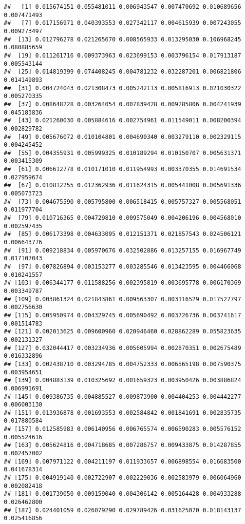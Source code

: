 \documentclass[
]{article}
\begin{document}
\begin{verbatim}
##   [1] 0.015674151 0.055481011 0.006943547 0.007470692 0.010689656 0.007471493
##   [7] 0.017156971 0.040393553 0.027342117 0.004615939 0.007243055 0.009273497
##  [13] 0.012796278 0.021265670 0.008565933 0.013295030 0.106968245 0.080885659
##  [19] 0.011261716 0.009373963 0.023699153 0.003796154 0.017913187 0.005543144
##  [25] 0.014819399 0.074408245 0.004781232 0.032287201 0.006821806 0.014149893
##  [31] 0.004724043 0.021308473 0.005242113 0.005816913 0.021030322 0.005270335
##  [37] 0.008648228 0.003264054 0.007839428 0.009285806 0.004241939 0.045183836
##  [43] 0.021260030 0.005884616 0.002754961 0.011549011 0.008200394 0.002829782
##  [49] 0.005676072 0.010104801 0.004690340 0.003279110 0.002329115 0.004245452
##  [55] 0.004355931 0.005999325 0.010189294 0.010150707 0.005631371 0.003415309
##  [61] 0.006612778 0.010171010 0.011954993 0.003370355 0.014691534 0.027959674
##  [67] 0.010812255 0.012362936 0.011624315 0.005441008 0.005691336 0.005073723
##  [73] 0.004675590 0.005795800 0.006518415 0.005757327 0.005568051 0.011977704
##  [79] 0.010716365 0.004729810 0.009575049 0.004206196 0.004568010 0.002597435
##  [85] 0.006173398 0.004633095 0.012151371 0.021857543 0.024506121 0.006643776
##  [91] 0.009218834 0.005970676 0.032502886 0.013257155 0.016967749 0.017107043
##  [97] 0.007826894 0.003153277 0.003285546 0.013423595 0.004466068 0.010241557
## [103] 0.006344177 0.011588256 0.002395819 0.003695778 0.006170369 0.003349787
## [109] 0.003861324 0.021843861 0.009563307 0.003116529 0.017527797 0.002756630
## [115] 0.005950974 0.004329745 0.005690492 0.003726736 0.003741617 0.001514783
## [121] 0.002013625 0.009600960 0.020946460 0.028862289 0.055823635 0.002131327
## [127] 0.032044417 0.003234936 0.005605994 0.002870351 0.002675489 0.016332896
## [133] 0.002438710 0.003294785 0.004752333 0.006565198 0.007590375 0.003954651
## [139] 0.004883139 0.010325692 0.001659323 0.003950426 0.003886824 0.006991691
## [145] 0.009386735 0.004885527 0.009873900 0.004404253 0.004442277 0.006003130
## [151] 0.013936878 0.001693553 0.002584842 0.001841691 0.002835735 0.017880584
## [157] 0.012585983 0.006140956 0.006765574 0.006590283 0.005576152 0.005524616
## [163] 0.005624816 0.004718685 0.007286757 0.009433875 0.014287855 0.002457002
## [169] 0.007971122 0.004211197 0.011933657 0.006898554 0.016683500 0.041678314
## [175] 0.004919140 0.002722907 0.002229036 0.002583979 0.006064960 0.002082418
## [181] 0.001739050 0.009159040 0.004306142 0.005164428 0.004933288 0.026462800
## [187] 0.024401059 0.026079290 0.029789426 0.031625070 0.018143137 0.025416856

\end{verbatim}
\end{document}
